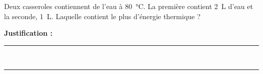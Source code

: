 Deux casseroles contiennent de l'eau à \qty{80}{\degreeCelsius}. La première contient \qty{2}{L} d'eau et la seconde, \qty{1}{L}. Laquelle contient le plus d'énergie thermique ?

\choices

\noindent\textbf{Justification :} \hrulefill \\[2.5ex]
\rule{\linewidth}{0.4pt} \\[2.5ex]
\rule{\linewidth}{0.4pt}
\vfill
